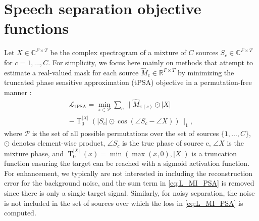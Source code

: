 \documentclass[a4paper]{article}
\begin{document}
\vspace{-0.2cm}
\section{Speech separation objective functions} \vspace{-0.1cm}
\label{sec:objectives}
Let $X \in \mathbb{C}^{F\times T}$ be the complex spectrogram of a mixture of $C$ sources $S_c \in \mathbb{C}^{F\times T}$ for $c=1,\dots,C$. For simplicity, we focus here mainly on methods that attempt to estimate a real-valued mask for each source $\hat{M}_c \in \mathbb{R}^{F\times T}$ by minimizing the truncated phase sensitive approximation (tPSA) objective \cite{Erdogan2015} in a permutation-free manner \cite{Hershey2016, Isik2016, Kolbaek2017}:
\begin{multline}
	\mathcal{L}_{\text{tPSA}} = \min_{\pi \in \mathcal{P}} \sum_{c} \Big\| \hat{M}_{\pi(c)} \odot |X| 
	\\ - \operatorname{T}_{0}^{|X|}\left(|S_c| \odot \cos(\angle S_c - \angle X)\right) \Big\|_1, \label{eq:L_MI_PSA}
\end{multline}
where $\mathcal{P}$ is the set of all possible permutations over the set of sources $\{1,\dots, C\}$, $\odot$ denotes element-wise product, $\angle S_c$ is the true phase of source c, $\angle X$ is the mixture phase, and $\operatorname{T}_{0}^{|X|}(x)= \min(\max(x,0),|X|)$ is a truncation function ensuring the target can be reached with a sigmoid activation function.  For enhancement, we typically are not interested in including the reconstruction error for the background noise, and the sum term in \eqref{eq:L_MI_PSA} is removed since there is only a single target signal.  Similarly, for noisy separation, the noise is not included in the set of sources over which the loss in \eqref{eq:L_MI_PSA} is computed.
\end{document}
